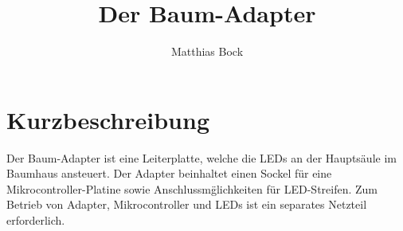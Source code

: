 \documentclass[a4paper,11pt]{article}
\title{Der Baum-Adapter}
\author{Matthias Bock}
\begin{document}
\maketitle

\section{Kurzbeschreibung}

Der Baum-Adapter ist eine Leiterplatte,
welche die LEDs an der Haupts\"aule im Baumhaus ansteuert.
Der Adapter beinhaltet einen Sockel
f\"ur eine Mikrocontroller-Platine
sowie Anschlussm\"glichkeiten f\"ur LED-Streifen.
Zum Betrieb von Adapter, Mikrocontroller und LEDs
ist ein separates Netzteil erforderlich.

\newpage


\newpage


\newpage


\newpage
%

\newpage
%
\end{document}
